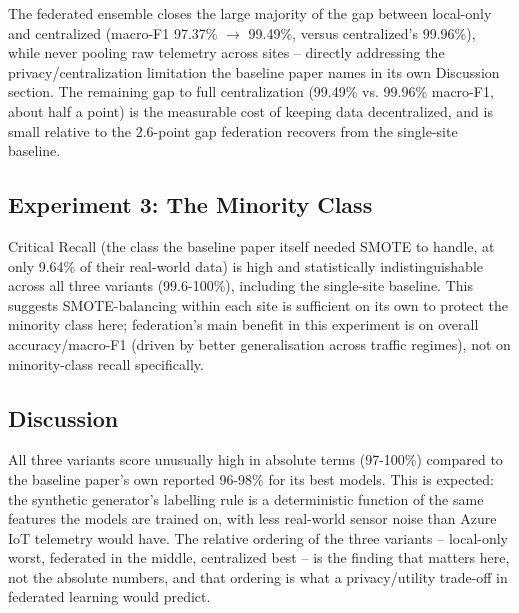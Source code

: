 The federated ensemble closes the large majority of the gap between local-only and centralized (macro-F1 97.37\% $\to$ 99.49\%, versus centralized's 99.96\%), while never pooling raw telemetry across sites -- directly addressing the privacy/centralization limitation the baseline paper names in its own Discussion section. The remaining gap to full centralization (99.49\% vs. 99.96\% macro-F1, about half a point) is the measurable cost of keeping data decentralized, and is small relative to the 2.6-point gap federation recovers from the single-site baseline.

\subsection{Experiment 3: The Minority Class}
\label{sec:evalThree}

Critical Recall (the class the baseline paper itself needed SMOTE to handle, at only 9.64\% of their real-world data) is high and statistically indistinguishable across all three variants (99.6-100\%), including the single-site baseline. This suggests SMOTE-balancing within each site is sufficient on its own to protect the minority class here; federation's main benefit in this experiment is on overall accuracy/macro-F1 (driven by better generalisation across traffic regimes), not on minority-class recall specifically.

\subsection{Discussion}
\label{sec:discussion}

All three variants score unusually high in absolute terms (97-100\%) compared to the baseline paper's own reported 96-98\% for its best models. This is expected: the synthetic generator's labelling rule is a deterministic function of the same features the models are trained on, with less real-world sensor noise than Azure IoT telemetry would have. The relative ordering of the three variants -- local-only worst, federated in the middle, centralized best -- is the finding that matters here, not the absolute numbers, and that ordering is what a privacy/utility trade-off in federated learning would predict.
